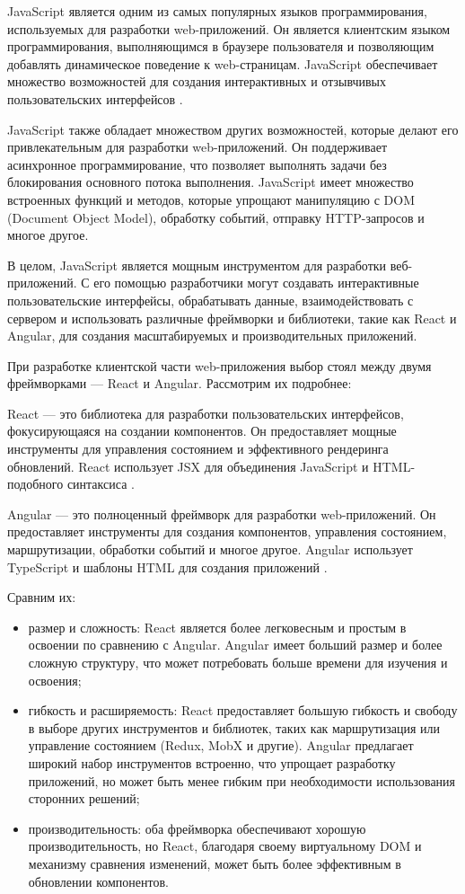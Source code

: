 JavaScript является одним из самых популярных языков программирования, используемых для разработки web-приложений. Он является клиентским языком программирования, выполняющимся в браузере пользователя и позволяющим добавлять динамическое поведение к web-страницам. JavaScript обеспечивает множество возможностей для создания интерактивных и отзывчивых пользовательских интерфейсов \cite{JavaScript}.

JavaScript также обладает множеством других возможностей, которые делают его привлекательным для разработки web-приложений. Он поддерживает асинхронное программирование, что позволяет выполнять задачи без блокирования основного потока выполнения. JavaScript имеет множество встроенных функций и методов, которые упрощают манипуляцию с DOM (Document Object Model), обработку событий, отправку HTTP-запросов и многое другое.

В целом, JavaScript является мощным инструментом для разработки веб-приложений. С его помощью разработчики могут создавать интерактивные пользовательские интерфейсы, обрабатывать данные, взаимодействовать с сервером и использовать различные фреймворки и библиотеки, такие как React и Angular, для создания масштабируемых и производительных приложений.

При разработке клиентской части web-приложения выбор стоял между двумя фреймворками — React и Angular. Рассмотрим их подробнее:

React — это библиотека для разработки пользовательских интерфейсов, фокусирующаяся на создании компонентов. Он предоставляет мощные инструменты для управления состоянием и эффективного рендеринга обновлений. React использует JSX для объединения JavaScript и HTML-подобного синтаксиса \cite{React}.

Angular — это полноценный фреймворк для разработки web-приложений. Он предоставляет инструменты для создания компонентов, управления состоянием, маршрутизации, обработки событий и многое другое. Angular использует TypeScript и шаблоны HTML для создания приложений \cite{Angular}.

Сравним их:

\begin{itemize}
    \item размер и сложность: React является более легковесным и простым в освоении по сравнению с Angular. Angular имеет больший размер и более сложную структуру, что может потребовать больше времени для изучения и освоения;
    \item гибкость и расширяемость: React предоставляет большую гибкость и свободу в выборе других инструментов и библиотек, таких как маршрутизация или управление состоянием (Redux, MobX и другие). Angular предлагает широкий набор инструментов встроенно, что упрощает разработку приложений, но может быть менее гибким при необходимости использования сторонних решений;
    \item производительность: оба фреймворка обеспечивают хорошую производительность, но React, благодаря своему виртуальному DOM и механизму сравнения изменений, может быть более эффективным в обновлении компонентов.
\end{itemize}


